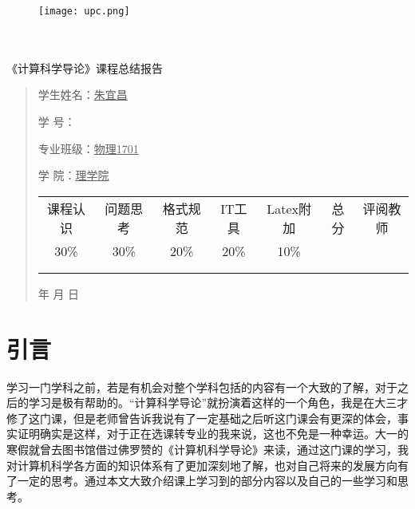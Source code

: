 \documentclass{article}
\renewcommand{\today}{\number\year 年 \number\month 月 \number\day 日}
\begin{document}
\begin{figure}
    \centering
    \texttt{[image: upc.png]}

    \label{figupc}
\end{figure}

	\begin{center}
		\quad \\
		\quad \\
		\heiti \fontsize{45}{17} \quad \quad \quad 
		\vskip 1.5cm
		\heiti {} 《计算科学导论》课程总结报告
	\end{center}
	\vskip 2.0cm
		
	\begin{quotation}
		\doublespacing
		
        \par\setlength\parindent{7em}
		\quad 

		学生姓名：\underline{\qquad  朱宜昌 \qquad \quad}

		学\hspace{0.61cm} 号：\underline{\qquad}
		
		专业班级：\underline{\qquad 物理1701 \qquad  }
		
        学\hspace{0.61cm} 院：\underline{\qquad \quad 理学院 \qquad \quad}
		\vskip 2cm
		\centering
		\begin{table}[h]
            \centering 
            \begin{tabular}{|c|c|c|c|c|c|c|}
                \hline
                课程认识 & 问题思 考 & 格式规范  & IT工具  & Latex附加  & 总分 & 评阅教师 \\
                30\% & 30\% & 20\% & 20\% & 10\% &  &  \\
                \hline
                 & & & & & &\\
                & & & & & &\\
                \hline
            \end{tabular}
        \end{table}
		\vskip 2cm
		\today
	\end{quotation}

\thispagestyle{empty}
\newpage
\setcounter{page}{1}
\section{引言}
学习一门学科之前，若是有机会对整个学科包括的内容有一个大致的了解，对于之后的学习是极有帮助的。“计算科学导论”就扮演着这样的一个角色，我是在大三才修了这门课，但是老师曾告诉我说有了一定基础之后听这门课会有更深的体会，事实证明确实是这样，对于正在选课转专业的我来说，这也不免是一种幸运。大一的寒假就曾去图书馆借过佛罗赞的《计算机科学导论》来读，通过这门课的学习，我对计算机科学各方面的知识体系有了更加深刻地了解，也对自己将来的发展方向有了一定的思考。通过本文大致介绍课上学习到的部分内容以及自己的一些学习和思考。
\end{document}
